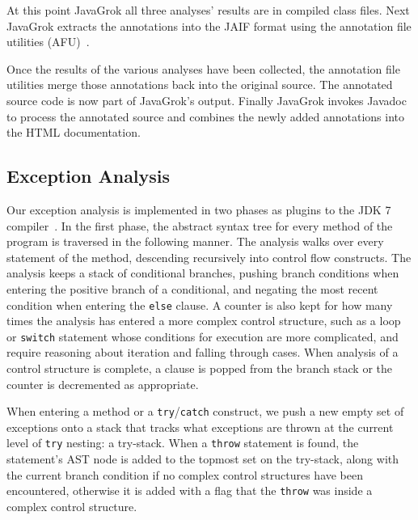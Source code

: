At this point JavaGrok all three analyses' results are in compiled class files.
Next JavaGrok extracts the annotations into the JAIF 
format using the annotation file utilities (AFU)~\cite{AFU}.

Once the results of the various analyses have been collected, the annotation file utilities merge
those annotations back into the original source. The annotated source
code is now part of JavaGrok's output. Finally JavaGrok invokes 
Javadoc to process the annotated source and combines the newly added 
annotations into the HTML documentation.

\subsection{Exception Analysis}
\label{sec:exception_impl}
Our exception analysis is implemented in two phases as plugins to the JDK 7
compiler~\cite{AFU,pluggable}.
In the first phase, the
abstract syntax tree for every method of the program is traversed in the
following manner.  The analysis walks over every statement of the method,
descending recursively into control flow constructs.  The analysis keeps a stack
of conditional branches, pushing branch conditions when entering the positive
branch of a conditional, and negating the most recent condition when entering
the \texttt{else} clause.  A counter is also kept for how many times the
analysis has entered a more complex control structure, such as a loop or
\texttt{switch} statement whose conditions for execution are more complicated,
and require reasoning about iteration and falling through cases.  When
analysis of a control structure is complete, a clause is popped from the
branch stack or the counter is decremented as appropriate.

When entering a method or a \texttt{try}/\texttt{catch} construct, we push a new empty set of exceptions onto
a stack that tracks what exceptions are thrown at the current level of
\texttt{try} nesting: a try-stack.
When a \texttt{throw} statement is found, the statement's AST node is added to the
topmost set on the try-stack, 
along with the current branch condition if no complex control structures have
been encountered, otherwise it is added with a flag that the \texttt{throw} was inside a
complex control structure.


